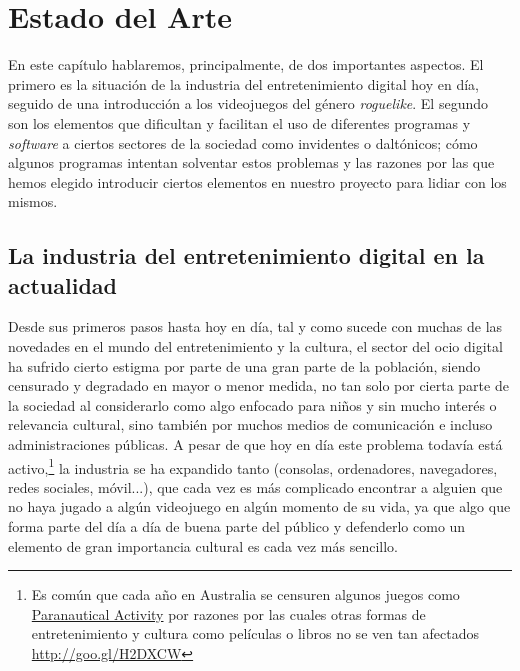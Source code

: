 \chapter{Estado del Arte}

En este capítulo hablaremos, principalmente, de dos importantes aspectos. El primero es la situación de la industria del entretenimiento digital hoy en día, seguido de una introducción a los videojuegos del género \textit{roguelike}. El segundo son los elementos que dificultan y facilitan el uso de diferentes programas y \textit{software} a ciertos sectores de la sociedad como invidentes o daltónicos; cómo algunos programas intentan solventar estos problemas y las razones por las que hemos elegido introducir ciertos elementos en nuestro proyecto para lidiar con los mismos.

\section{La industria del entretenimiento digital en la actualidad}

Desde sus primeros pasos hasta hoy en día, tal y como sucede con muchas de las novedades en el mundo del entretenimiento y la cultura, el sector del ocio digital ha sufrido cierto estigma por parte de una gran parte de la población, siendo censurado y degradado en mayor o menor medida, no tan solo por cierta parte de la sociedad al considerarlo como algo enfocado para niños y sin mucho interés o relevancia cultural, sino también por muchos medios de comunicación e incluso administraciones públicas. A pesar de que hoy en día este problema todavía está activo,\footnote{Es común que cada año en Australia se censuren algunos juegos como \href{http://goo.gl/hFrQah}{Paranautical Activity} por razones por las cuales otras formas de entretenimiento y cultura como películas o libros no se ven tan afectados \url{http://goo.gl/H2DXCW}} la industria se ha expandido tanto (consolas, ordenadores, navegadores, redes sociales, móvil...), que cada vez es más complicado encontrar a alguien que no haya jugado a algún videojuego en algún momento de su vida, ya que algo que forma parte del día a día de buena parte del público y defenderlo como un elemento de gran importancia cultural es cada vez más sencillo.

